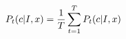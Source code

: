 \begin{equation}
\LARGE 
P_{t}(c|I,x) = \frac{1}{T} \sum_{t=1}^{T} P_{t}(c|I,x)
\label{eq:ni:decision}
\end{equation}